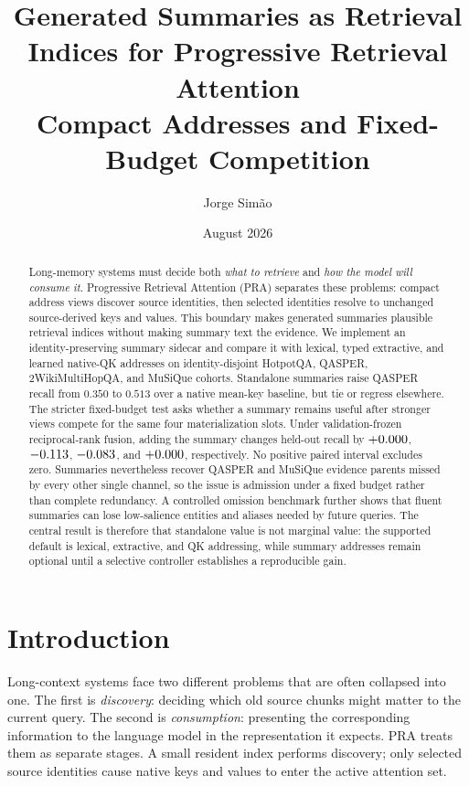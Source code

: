 \documentclass[11pt]{article}
\title{Generated Summaries as Retrieval Indices for Progressive Retrieval Attention\\
\large Compact Addresses and Fixed-Budget Competition}
\author{Jorge Sim\~ao}
\date{August 2026}
\newcommand{\pra}{\textsc{PRA}\xspace}
\begin{document}
\maketitle

\begin{abstract}
Long-memory systems must decide both \emph{what to retrieve} and \emph{how the
model will consume it}. Progressive Retrieval Attention (\pra) separates these
problems: compact address views discover source identities, then selected
identities resolve to unchanged source-derived keys and values. This boundary
makes generated summaries plausible retrieval indices without making summary
text the evidence. We implement an identity-preserving summary sidecar and
compare it with lexical, typed extractive, and learned native-QK addresses on
identity-disjoint HotpotQA, QASPER, 2WikiMultiHopQA, and MuSiQue cohorts.
Standalone summaries raise QASPER recall from $0.350$ to $0.513$ over a native
mean-key baseline, but tie or regress elsewhere. The stricter fixed-budget test
asks whether a summary remains useful after stronger views compete for the same
four materialization slots. Under validation-frozen reciprocal-rank fusion,
adding the summary changes held-out recall by
$+0.000$, $-0.113$,
$-0.083$, and
$+0.000$, respectively. No positive paired
interval excludes zero. Summaries nevertheless recover
\PaperThreeOneSummaryUniqueQasper{} QASPER and
\PaperThreeOneSummaryUniqueMusique{} MuSiQue evidence parents missed by every
other single channel, so the issue is admission under a fixed budget rather
than complete redundancy. A controlled omission benchmark further shows that
fluent summaries can lose low-salience entities and aliases needed by future
queries. The central result is therefore that standalone value is not marginal
value: the supported default is lexical, extractive, and QK addressing, while
summary addresses remain optional until a selective controller establishes a
reproducible gain.
\end{abstract}

\section{Introduction}

Long-context systems face two different problems that are often collapsed into one. The first is \emph{discovery}: deciding which old source chunks might matter to the current query. The second is \emph{consumption}: presenting the corresponding information to the language model in the representation it expects. \pra treats them as separate stages. A small resident index performs discovery; only selected source identities cause native keys and values to enter the active attention set.
\end{document}
